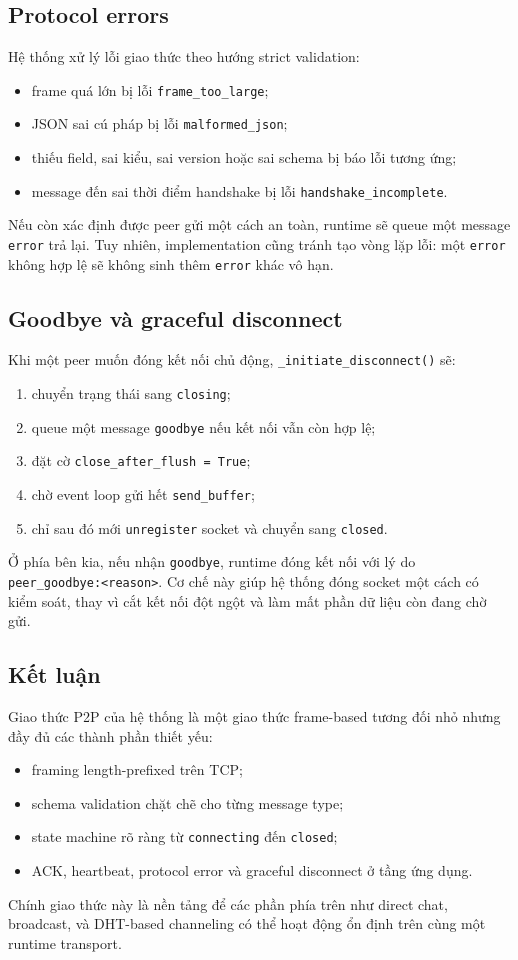 \subsection{Protocol errors}
Hệ thống xử lý lỗi giao thức theo hướng strict validation:
\begin{itemize}[leftmargin=2em]
    \item frame quá lớn bị lỗi \texttt{frame\_too\_large};
    \item JSON sai cú pháp bị lỗi \texttt{malformed\_json};
    \item thiếu field, sai kiểu, sai version hoặc sai schema bị báo lỗi tương ứng;
    \item message đến sai thời điểm handshake bị lỗi \texttt{handshake\_incomplete}.
\end{itemize}

Nếu còn xác định được peer gửi một cách an toàn, runtime sẽ queue một message \texttt{error} trả lại. Tuy nhiên, implementation cũng tránh tạo vòng lặp lỗi: một \texttt{error} không hợp lệ sẽ không sinh thêm \texttt{error} khác vô hạn.

\subsection{Goodbye và graceful disconnect}
Khi một peer muốn đóng kết nối chủ động, \texttt{\_initiate\_disconnect()} sẽ:
\begin{enumerate}[leftmargin=2em]
    \item chuyển trạng thái sang \texttt{closing};
    \item queue một message \texttt{goodbye} nếu kết nối vẫn còn hợp lệ;
    \item đặt cờ \texttt{close\_after\_flush = True};
    \item chờ event loop gửi hết \texttt{send\_buffer};
    \item chỉ sau đó mới \texttt{unregister} socket và chuyển sang \texttt{closed}.
\end{enumerate}

Ở phía bên kia, nếu nhận \texttt{goodbye}, runtime đóng kết nối với lý do \texttt{peer\_goodbye:<reason>}. Cơ chế này giúp hệ thống đóng socket một cách có kiểm soát, thay vì cắt kết nối đột ngột và làm mất phần dữ liệu còn đang chờ gửi.

\subsection{Kết luận}
Giao thức P2P của hệ thống là một giao thức frame-based tương đối nhỏ nhưng đầy đủ các thành phần thiết yếu:
\begin{itemize}[leftmargin=2em]
    \item framing length-prefixed trên TCP;
    \item schema validation chặt chẽ cho từng message type;
    \item state machine rõ ràng từ \texttt{connecting} đến \texttt{closed};
    \item ACK, heartbeat, protocol error và graceful disconnect ở tầng ứng dụng.
\end{itemize}

Chính giao thức này là nền tảng để các phần phía trên như direct chat, broadcast, và DHT-based channeling có thể hoạt động ổn định trên cùng một runtime transport.
